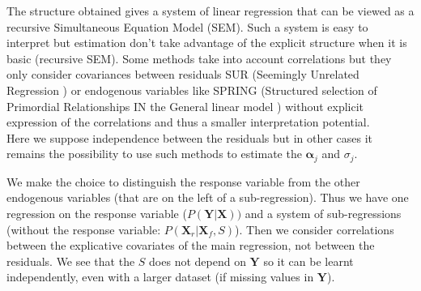 \documentclass[11pt,a4paper]{article}
\begin{document}
The structure obtained gives a system of linear regression that can be viewed as a recursive Simultaneous Equation Model (\textsc{SEM})\cite{davidson1993estimation}. Such a system is easy to interpret but estimation don't take advantage of the explicit structure \cite{TIMM} when it is basic (recursive \textsc{SEM}).
  	Some methods take into account correlations but they only consider covariances between residuals \textsc{SUR} (Seemingly Unrelated Regression \cite{SURzellner}) or  endogenous variables like \textsc{SPRING} (Structured selection of Primordial Relationships IN the General linear model \cite{chiquetconf}) without explicit expression of the correlations and thus a smaller interpretation potential.
  	\\ Here we suppose independence between the residuals but in other cases it remains the possibility to use such methods to estimate the $\boldsymbol{\alpha}_j$ and $\sigma_j$.

 	
	  We make the choice to distinguish the response variable from the other endogenous variables (that are on the left of a sub-regression). Thus we have one regression on the response variable ($P(\boldsymbol{Y}|\boldsymbol{X}))$ and a system of sub-regressions (without the response variable: $P(\boldsymbol{X}_r|\boldsymbol{X}_f,S)$). Then we consider correlations between the explicative covariates of the main regression, not between the residuals. We see that the $S$ does not depend on $\boldsymbol{Y}$ so it can be learnt independently, even with a larger dataset (if missing values in $\boldsymbol{Y}$).
	 


	
\end{document}
